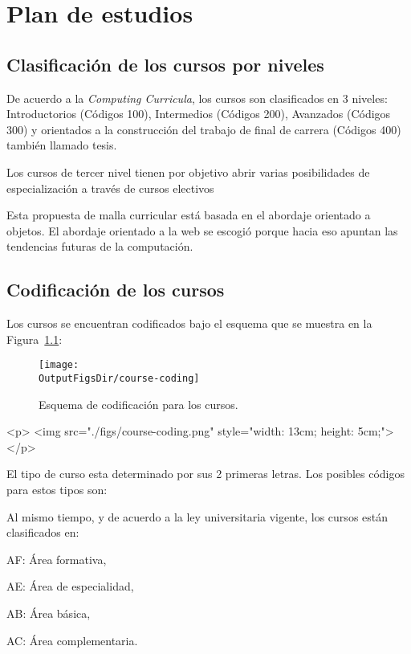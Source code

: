 \chapter{Plan de estudios \YYYY}\label{chap:GeneralInfo}

\section{Clasificación de los cursos por niveles}
De acuerdo a la \textit{Computing Curricula}, los cursos son clasificados en 3 niveles: Introductorios (Códigos 100), 
Intermedios  (Códigos 200), Avanzados  (Códigos 300) y orientados a la construcción del trabajo de final de carrera  (Códigos 400) también llamado tesis.

Los cursos de tercer nivel tienen por objetivo abrir varias posibilidades de especialización a través de cursos electivos

Esta propuesta de malla curricular está basada en el abordaje orientado a objetos. 
El abordaje orientado a la web se escogió porque hacia eso apuntan las tendencias 
futuras de la computación.

\section{Codificación de los cursos}
Los cursos se encuentran codificados bajo el esquema que se muestra en la Figura~\ref{fig:course-coding}:

\begin{latexonly}
      \begin{figure}[ht]
      \centering
      \texttt{[image: \\OutputFigsDir/course-coding]}
      \caption{Esquema de codificación para los cursos.}\label{fig:course-coding}
      \end{figure}
\end{latexonly}
\begin{htmlonly}
      \begin{rawhtml}
            <p>
                  <img src="./figs/course-coding.png" style="width: 13cm; height: 5cm;">
            </p>
      \end{rawhtml}
\end{htmlonly}

El tipo de curso esta determinado por sus 2 primeras letras. Los posibles códigos para estos tipos son:


Al mismo tiempo, y de acuerdo a la ley universitaria vigente, los cursos están clasificados en:
\begin{inparadesc}
\item [AF:] Área formativa,
\item [AE:] Área de especialidad,
\item [AB:] Área básica,
\item [AC:] Área complementaria.
\end{inparadesc}


